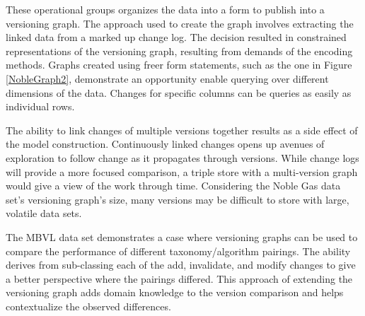 These operational groups organizes the data into a form to publish into a versioning graph.
The approach used to create the graph involves extracting the linked data from a marked up change log.
The decision resulted in constrained representations of the versioning graph, resulting from demands of the encoding methods.
Graphs created using freer form statements, such as the one in Figure \ref{NobleGraph2}, demonstrate an opportunity enable querying over different dimensions of the data.
Changes for specific columns can be queries as easily as individual rows.

The ability to link changes of multiple versions together results as a side effect of the model construction.
Continuously linked changes opens up avenues of exploration to follow change as it propagates through versions.
While change logs will provide a more focused comparison, a triple store with a multi-version graph would give a view of the work through time.
Considering the Noble Gas data set's versioning graph's size, many versions may be difficult to store with large, volatile data sets.

The MBVL data set demonstrates a case where versioning graphs can be used to compare the performance of different taxonomy/algorithm pairings.
The ability derives from sub-classing each of the add, invalidate, and modify changes to give a better perspective where the pairings differed.
This approach of extending the versioning graph adds domain knowledge to the version comparison and helps contextualize the observed differences.
